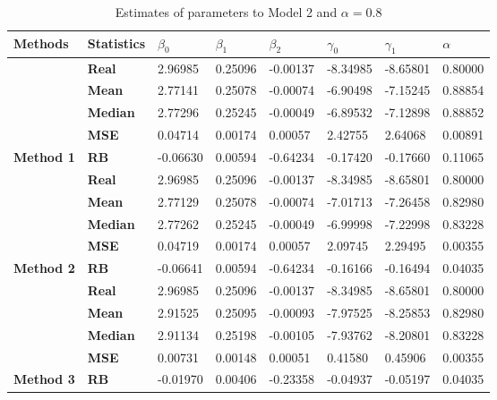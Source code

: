 \begin{table}

\caption{\label{tab:Est_model_2_Alpha0.8}Estimates of parameters to Model 2 and $\alpha=0.8$}
\centering
\begin{tabular}[t]{>{}l>{}lllllll}
\toprule
Methods & Statistics & $\beta_0$ & $\beta_1$ & $\beta_2$ & $\gamma_0$ & $\gamma_1$ & $\alpha$\\
\midrule
 & \textbf{Real} & 2.96985 & 0.25096 & -0.00137 & -8.34985 & -8.65801 & 0.80000\\
\cmidrule{2-8}
 & \textbf{Mean} & 2.77141 & 0.25078 & -0.00074 & -6.90498 & -7.15245 & 0.88854\\
\cmidrule{2-8}
 & \textbf{Median} & 2.77296 & 0.25245 & -0.00049 & -6.89532 & -7.12898 & 0.88852\\
\cmidrule{2-8}
 & \textbf{MSE} & 0.04714 & 0.00174 & 0.00057 & 2.42755 & 2.64068 & 0.00891\\
\cmidrule{2-8}
\multirow{-5}{*}{\raggedright\arraybackslash \textbf{Method 1}} & \textbf{RB} & -0.06630 & 0.00594 & -0.64234 & -0.17420 & -0.17660 & 0.11065\\
\cmidrule{1-8}
 & \textbf{Real} & 2.96985 & 0.25096 & -0.00137 & -8.34985 & -8.65801 & 0.80000\\
\cmidrule{2-8}
 & \textbf{Mean} & 2.77129 & 0.25078 & -0.00074 & -7.01713 & -7.26458 & 0.82980\\
\cmidrule{2-8}
 & \textbf{Median} & 2.77262 & 0.25245 & -0.00049 & -6.99998 & -7.22998 & 0.83228\\
\cmidrule{2-8}
 & \textbf{MSE} & 0.04719 & 0.00174 & 0.00057 & 2.09745 & 2.29495 & 0.00355\\
\cmidrule{2-8}
\multirow{-5}{*}{\raggedright\arraybackslash \textbf{Method 2}} & \textbf{RB} & -0.06641 & 0.00594 & -0.64234 & -0.16166 & -0.16494 & 0.04035\\
\cmidrule{1-8}
 & \textbf{Real} & 2.96985 & 0.25096 & -0.00137 & -8.34985 & -8.65801 & 0.80000\\
\cmidrule{2-8}
 & \textbf{Mean} & 2.91525 & 0.25095 & -0.00093 & -7.97525 & -8.25853 & 0.82980\\
\cmidrule{2-8}
 & \textbf{Median} & 2.91134 & 0.25198 & -0.00105 & -7.93762 & -8.20801 & 0.83228\\
\cmidrule{2-8}
 & \textbf{MSE} & 0.00731 & 0.00148 & 0.00051 & 0.41580 & 0.45906 & 0.00355\\
\cmidrule{2-8}
\multirow{-5}{*}{\raggedright\arraybackslash \textbf{Method 3}} & \textbf{RB} & -0.01970 & 0.00406 & -0.23358 & -0.04937 & -0.05197 & 0.04035\\
\bottomrule
\end{tabular}
\end{table}

